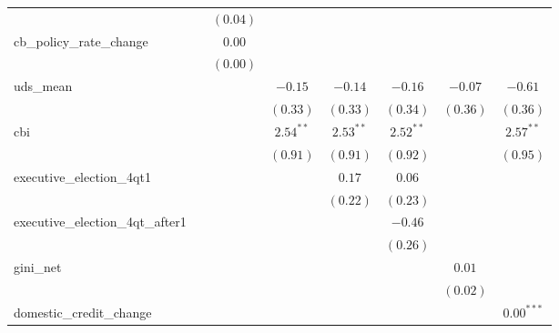 \begin{tabular}{l c c c c c c c }
                                 &               & $(0.04)$      &               &               &               &               &               \\
cb\_policy\_rate\_change         &               & $0.00$        &               &               &               &               &               \\
                                 &               & $(0.00)$      &               &               &               &               &               \\
uds\_mean                        &               &               & $-0.15$       & $-0.14$       & $-0.16$       & $-0.07$       & $-0.61$       \\
                                 &               &               & $(0.33)$      & $(0.33)$      & $(0.34)$      & $(0.36)$      & $(0.36)$      \\
cbi                              &               &               & $2.54^{**}$   & $2.53^{**}$   & $2.52^{**}$   &               & $2.57^{**}$   \\
                                 &               &               & $(0.91)$      & $(0.91)$      & $(0.92)$      &               & $(0.95)$      \\
executive\_election\_4qt1        &               &               &               & $0.17$        & $0.06$        &               &               \\
                                 &               &               &               & $(0.22)$      & $(0.23)$      &               &               \\
executive\_election\_4qt\_after1 &               &               &               &               & $-0.46$       &               &               \\
                                 &               &               &               &               & $(0.26)$      &               &               \\
gini\_net                        &               &               &               &               &               & $0.01$        &               \\
                                 &               &               &               &               &               & $(0.02)$      &               \\
domestic\_credit\_change         &               &               &               &               &               &               & $0.00^{***}$  \\

\end{tabular}
